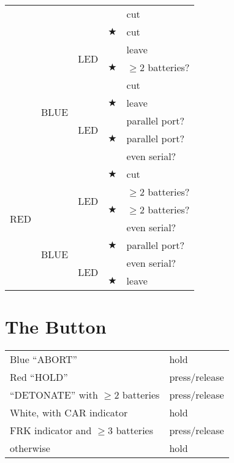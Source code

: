 \documentclass[11pt]{amsart}
\begin{document}
\begin{tabular}{|c|c|c|c|l|}
\hline
\multirow{8}{*}{} & \multirow{4}{*}{} & \multirow{2}{*}{} & & cut \\
\cline{4-5}
 & & & $\bigstar$ & cut \\
\cline{3-5}
 & & \multirow{2}{*}{LED} & & leave \\
\cline{4-5}
 & & & $\bigstar$ & $\ge 2$ batteries? \\
\cline{2-5}
 & \multirow{4}{*}{BLUE} & & & cut \\
\cline{4-5}
 & & & $\bigstar$ & leave \\
\cline{3-5}
 & & \multirow{2}{*}{LED} & & parallel port? \\
\cline{4-5}
 & & & $\bigstar$ & parallel port? \\
\hline
\multirow{8}{*}{RED} & \multirow{4}{*}{} & \multirow{2}{*}{} & & even serial?\\
\cline{4-5}
 & & & $\bigstar$ & cut \\
\cline{3-5}
 & & \multirow{2}{*}{LED} & & $\ge 2$ batteries? \\
\cline{4-5}
 & & & $\bigstar$ & $\ge 2$ batteries? \\
\cline{2-5}
 & \multirow{4}{*}{BLUE} & & & even serial? \\
\cline{4-5}
 & & & $\bigstar$ & parallel port? \\
\cline{3-5}
 & & \multirow{2}{*}{LED} & & even serial? \\
\cline{4-5}
 & & & $\bigstar$ & leave \\
\hline
\end{tabular}



\section{The Button}

\begin{tabular}{|l|l|}
\hline
Blue ``ABORT''                      & hold          \\
Red ``HOLD''                        & press/release \\
``DETONATE'' with $\ge 2$ batteries & press/release \\
White, with CAR indicator           & hold          \\
FRK indicator and $\ge 3$ batteries & press/release \\
otherwise                           & hold          \\
\hline
\end{tabular}
\end{document}
